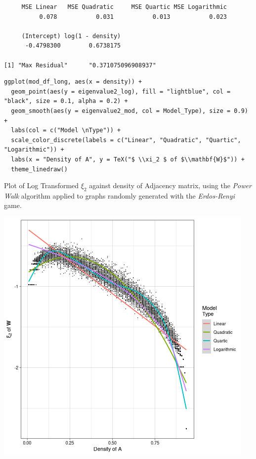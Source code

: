 \documentclass[11pt]{article}
\begin{document}
\begin{verbatim}
     MSE Linear   MSE Quadratic     MSE Quartic MSE Logarithmic
          0.078           0.031           0.013           0.023

     (Intercept) log(1 - density)
      -0.4798300        0.6738175

[1] "Max Residual"      "0.371075096908937"
\end{verbatim}


\begin{listing}[htbp]
\begin{verbatim}
ggplot(mod_df_long, aes(x = density)) +
  geom_point(aes(y = eigenvalue2_log), fill = "lightblue", col = "black", size = 0.1, alpha = 0.2) +
  geom_smooth(aes(y = eigenvalue2_mod, col = Model_Type), size = 0.9) +
  labs(col = c("Model \nType")) +
  scale_color_discrete(labels = c("Linear", "Quadratic", "Quartic", "Logarithmic")) +
  labs(x = "Density of A", y = TeX("$ \\xi_2 $ of $\\mathbf{W}$")) +
  theme_linedraw()
\end{verbatim}
\caption{\label{fig:dens_plot_er_log}Plot of Log Transformed \(\xi_{2}\) against density of Adjacency matrix, using the \emph{Power Walk} algorithm applied to graphs randomly generated with the \emph{Erdos-Renyi} game.}
\end{listing}

\begin{center}
\includegraphics[width=.9\linewidth]{media/dens_plot_er_log.png}
\end{center}
\end{document}

